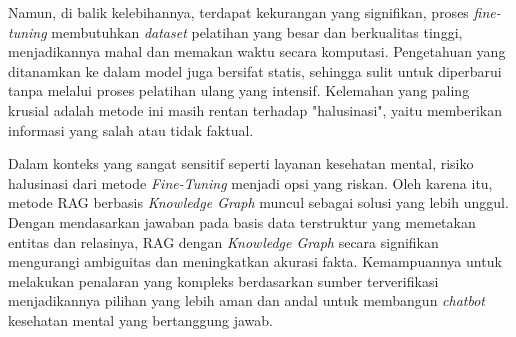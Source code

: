Namun, di balik kelebihannya, terdapat kekurangan yang signifikan, proses \textit{fine-tuning} membutuhkan \textit{dataset} pelatihan yang besar dan berkualitas tinggi, menjadikannya mahal dan memakan waktu secara komputasi.
Pengetahuan yang ditanamkan ke dalam model juga bersifat statis, sehingga sulit untuk diperbarui tanpa melalui proses pelatihan ulang yang intensif.
Kelemahan yang paling krusial adalah metode ini masih rentan terhadap "halusinasi", yaitu memberikan informasi yang salah atau tidak faktual.

Dalam konteks yang sangat sensitif seperti layanan kesehatan mental, risiko halusinasi dari metode \textit{Fine-Tuning} menjadi opsi yang riskan.
Oleh karena itu, metode RAG berbasis \textit{\textit{Knowledge Graph}} muncul sebagai solusi yang lebih unggul.
Dengan mendasarkan jawaban pada basis data terstruktur yang memetakan entitas dan relasinya, RAG dengan \textit{Knowledge Graph} secara signifikan mengurangi ambiguitas dan meningkatkan akurasi fakta.
Kemampuannya untuk melakukan penalaran yang kompleks berdasarkan sumber terverifikasi menjadikannya pilihan yang lebih aman dan andal untuk membangun \textit{chatbot} kesehatan mental yang bertanggung jawab.
